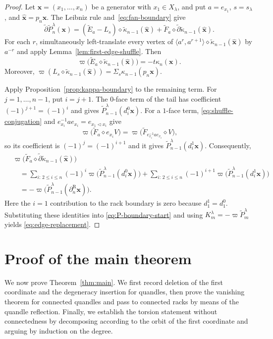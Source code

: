\documentclass[11pt]{article}
\newcommand{\tkap}{\widetilde\kappa}
\newcommand{\tF}{\widetilde F}
\newcommand{\tE}{\widetilde E}
\newcommand{\tP}{\widetilde P}
\newcommand{\td}{\widetilde\partial}
\newcommand{\R}{\mathrm R}
\begin{document}
\begin{proof}
Let $\mathbf x=(x_1,\ldots,x_n)$ be a generator with $x_1\in X_\lambda$, and put $a=e_{x_1}$, $s=s_\lambda$, and $\widehat{\mathbf x}=p_n\mathbf x$. The Leibniz rule and~\eqref{eq:fan-boundary} give
\begin{equation}
 \td\tP_n^\lambda(\mathbf x)
 =(\tE_a-L_s)\diamond\tkap_{n-1}(\widehat{\mathbf x})
 +\tF_a\diamond\td\tkap_{n-1}(\widehat{\mathbf x}).
 \label{eq:P-boundary-start}
\end{equation}
For each $r$, simultaneously left-translate every vertex of
$\langle a^r,a^{r+1}\rangle\diamond
\tkap_{n-1}(\widehat{\mathbf x})$ by $a^{-r}$ and apply
Lemma~\ref{lem:first-edge-shuffle}. Then
\[
 \varpi\bigl(\tE_a\diamond\tkap_{n-1}(\widehat{\mathbf x})\bigr)
 =-t\kappa_n(\mathbf x).
\]
Moreover,
$\varpi(L_s\diamond\tkap_{n-1}(\widehat{\mathbf x}))=\Sigma_s\kappa_{n-1}(p_n\mathbf x)$.

Apply Proposition~\ref{prop:kappa-boundary} to the remaining term.
For $j=1,\ldots,n-1$, put $i=j+1$. The $0$-face term of the
tail has coefficient $(-1)^{j+1}=(-1)^i$ and gives
$\tP_{n-1}^\lambda(d_i^0\mathbf x)$. For a $1$-face term,
\eqref{eq:shuffle-conjugation} and
$e_{x_i}^{-1}ae_{x_i}=e_{x_1\lhd x_i}$ give
\[
\varpi\bigl(\tF_a\diamond e_{x_i}V\bigr)
=
\varpi\bigl(\tF_{e_{x_i}^{-1}ae_{x_i}}\diamond V\bigr),
\]
so its coefficient is $(-1)^j=(-1)^{i+1}$ and it gives
$\tP_{n-1}^\lambda(d_i^1\mathbf x)$. Consequently,
\begin{align*}
&\varpi\bigl(
\tF_a\diamond\td\tkap_{n-1}(\widehat{\mathbf x})
\bigr)\\
&\quad=
\sum_{i:\,2\le i\le n}(-1)^i
\varpi\bigl(\tP_{n-1}^\lambda(d_i^0\mathbf x)\bigr)
+
\sum_{i:\,2\le i\le n}(-1)^{i+1}
\varpi\bigl(\tP_{n-1}^\lambda(d_i^1\mathbf x)\bigr)\\
&\quad=
-\varpi\bigl(
\tP_{n-1}^\lambda(\partial_n^\R\mathbf x)
\bigr).
\end{align*}
Here the $i=1$ contribution to the rack boundary is zero because
$d_1^1=d_1^0$. Substituting these identities into
\eqref{eq:P-boundary-start} and using
$K_m^\lambda=-\varpi\tP_m^\lambda$ yields
\eqref{eq:edge-replacement}.
\end{proof}

\section{Proof of the main theorem}

We now prove Theorem~\ref{thm:main}. We first record deletion of the first coordinate and the degeneracy insertion for quandles, then prove the vanishing theorem for connected quandles and pass to connected racks by means of the quandle reflection. Finally, we establish the torsion statement without connectedness by decomposing according to the orbit of the first coordinate and arguing by induction on the degree.
\end{document}
